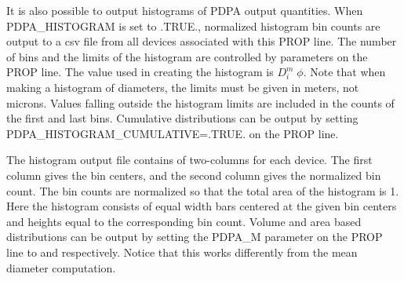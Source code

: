 \documentclass[11pt]{book}
\begin{document}
It is also possible to output histograms of PDPA output quantities. When {\ct PDPA\_HISTOGRAM} is set to {\ct .TRUE.}, normalized histogram bin counts are output to a csv file from all devices associated with this {\ct PROP} line. The number of bins and the limits of the histogram are controlled by parameters on the {\ct PROP} line. The value used in creating the histogram is $D_i^m \; \phi$. Note that when making a histogram of diameters, the limits must be given in meters, not microns. Values falling outside the histogram limits are included in the counts of the first and last bins. Cumulative distributions can be output by setting {\ct PDPA\_HISTOGRAM\_CUMULATIVE=.TRUE.} on the {\ct PROP} line.

The histogram output file contains of two-columns for each device. The first column gives the bin centers, and the second column gives the normalized bin count. The bin counts are normalized so that the total area of the histogram is 1. Here the histogram consists of equal width bars centered at the given bin centers and heights equal to the corresponding bin count. Volume and area based distributions can be output by setting the {\ct PDPA\_M} parameter on the {\ct PROP} line to {} and {} respectively. Notice that this works differently from the mean diameter computation.
\end{document}
